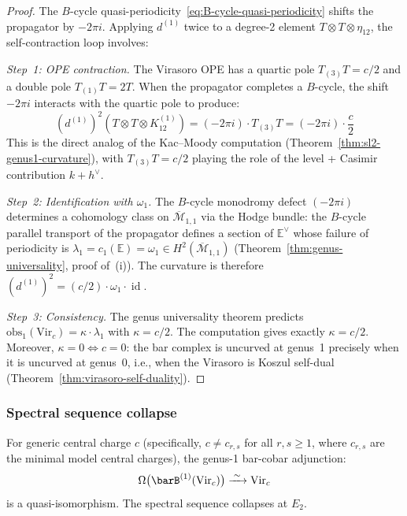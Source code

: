 \begin{proof}
The $B$-cycle quasi-periodicity~\eqref{eq:B-cycle-quasi-periodicity}
shifts the propagator by $-2\pi i$.  Applying $d^{(1)}$ twice to a
degree-2 element $T \otimes T \otimes \eta_{12}$, the self-contraction
loop involves:

\emph{Step~1: OPE contraction.}
The Virasoro OPE has a quartic pole $T_{(3)}T = c/2$ and a double pole
$T_{(1)}T = 2T$.  When the propagator completes a $B$-cycle, the
shift $-2\pi i$ interacts with the quartic pole to produce:
\begin{equation}
(d^{(1)})^2(T \otimes T \otimes K^{(1)}_{12})
= (-2\pi i) \cdot T_{(3)}T = (-2\pi i) \cdot \frac{c}{2}
\end{equation}
This is the direct analog of the Kac--Moody computation
(Theorem~\ref{thm:sl2-genus1-curvature}), with $T_{(3)}T = c/2$ playing
the role of the level + Casimir contribution $k + h^\vee$.

\emph{Step~2: Identification with $\omega_1$.}
The $B$-cycle monodromy defect $(-2\pi i)$ determines a cohomology
class on $\overline{\mathcal{M}}_{1,1}$ via the Hodge bundle: the
$B$-cycle parallel transport of the propagator defines a section of
$\mathbb{E}^\vee$ whose failure of periodicity is $\lambda_1 = c_1(\mathbb{E})
= \omega_1 \in H^2(\overline{\mathcal{M}}_{1,1})$
(Theorem~\ref{thm:genus-universality}, proof of~(i)).
The curvature is therefore
$(d^{(1)})^2 = (c/2) \cdot \omega_1 \cdot \operatorname{id}$.

\emph{Step~3: Consistency.}
The genus universality theorem predicts
$\mathrm{obs}_1(\mathrm{Vir}_c) = \kappa \cdot \lambda_1$ with
$\kappa = c/2$.  The computation gives exactly $\kappa = c/2$.
Moreover, $\kappa = 0 \iff c = 0$: the bar complex is uncurved at
genus~1 precisely when it is uncurved at genus~0, i.e., when the
Virasoro is Koszul self-dual (Theorem~\ref{thm:virasoro-self-duality}).
\end{proof}

\subsubsection{Spectral sequence collapse}

\begin{theorem}
\label{thm:vir-genus1-inversion}
For generic central charge $c$ (specifically, $c \neq c_{r,s}$ for all
$r, s \geq 1$, where $c_{r,s}$ are the minimal model central charges),
the genus-1 bar-cobar adjunction:
\begin{equation}
\Omega\bigl(\barB^{(1)}(\mathrm{Vir}_c)\bigr) \xrightarrow{\;\sim\;} \mathrm{Vir}_c
\end{equation}
is a quasi-isomorphism.  The spectral sequence collapses at $E_2$.
\end{theorem}

